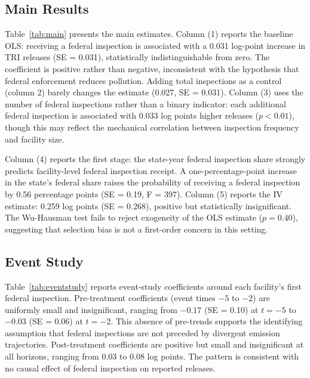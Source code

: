 \documentclass[12pt]{article}
\begin{document}
\subsection{Main Results}



Table~\ref{tab:main} presents the main estimates. Column (1) reports the baseline OLS: receiving a federal inspection is associated with a 0.031 log-point increase in TRI releases (SE = 0.031), statistically indistinguishable from zero. The coefficient is positive rather than negative, inconsistent with the hypothesis that federal enforcement reduces pollution. Adding total inspections as a control (column 2) barely changes the estimate (0.027, SE = 0.031). Column (3) uses the number of federal inspections rather than a binary indicator: each additional federal inspection is associated with 0.033 log points higher releases ($p < 0.01$), though this may reflect the mechanical correlation between inspection frequency and facility size.

Column (4) reports the first stage: the state-year federal inspection share strongly predicts facility-level federal inspection receipt. A one-percentage-point increase in the state's federal share raises the probability of receiving a federal inspection by 0.56 percentage points (SE = 0.19, F = 397). Column (5) reports the IV estimate: 0.259 log points (SE = 0.268), positive but statistically insignificant. The Wu-Hausman test fails to reject exogeneity of the OLS estimate ($p = 0.40$), suggesting that selection bias is not a first-order concern in this setting.

\subsection{Event Study}



Table~\ref{tab:eventstudy} reports event-study coefficients around each facility's first federal inspection. Pre-treatment coefficients (event times $-5$ to $-2$) are uniformly small and insignificant, ranging from $-0.17$ (SE = 0.10) at $t = -5$ to $-0.03$ (SE = 0.06) at $t = -2$. This absence of pre-trends supports the identifying assumption that federal inspections are not preceded by divergent emission trajectories. Post-treatment coefficients are positive but small and insignificant at all horizons, ranging from 0.03 to 0.08 log points. The pattern is consistent with no causal effect of federal inspection on reported releases.
\end{document}
